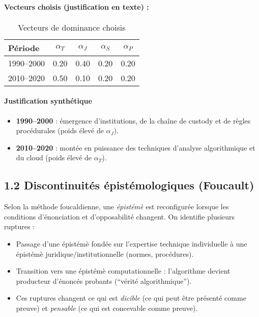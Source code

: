 \documentclass[12pt,a4paper]{article}
\begin{document}
\paragraph{Vecteurs choisis (justification en texte) :}
\begin{table}[h]
  \centering
  \caption{Vecteurs de dominance choisis}
  \begin{tabular}{l c c c c}
    \toprule
    Période & $\alpha_T$ & $\alpha_J$ & $\alpha_S$ & $\alpha_P$ \\
    \midrule
    1990--2000 & 0.20 & 0.40 & 0.20 & 0.20 \\
    2010--2020 & 0.50 & 0.10 & 0.20 & 0.20 \\
    \bottomrule
  \end{tabular}
\end{table}

\paragraph{Justification synthétique}
\begin{itemize}
  \item \textbf{1990--2000} : émergence d'institutions, de la chaîne de custody et de règles procédurales (poids élevé de $\alpha_J$).
  \item \textbf{2010--2020} : montée en puissance des techniques d'analyse algorithmique et du cloud (poids élevé de $\alpha_T$).
\end{itemize}

\subsection{1.2 Discontinuités épistémologiques (Foucault)}
Selon la méthode foucaldienne, une \emph{épistémè} est reconfigurée lorsque les conditions d'énonciation et d'opposabilité changent. On identifie plusieurs ruptures :
\begin{itemize}
  \item Passage d'une épistémè fondée sur l'expertise technique individuelle à une épistémè juridique/institutionnelle (normes, procédures).
  \item Transition vers une épistémè computationnelle : l'algorithme devient producteur d'énoncés probants (``vérité algorithmique'').
  \item Ces ruptures changent ce qui est \emph{dicible} (ce qui peut être présenté comme preuve) et \emph{pensable} (ce qui est concevable comme preuve).
\end{itemize}
\end{document}
